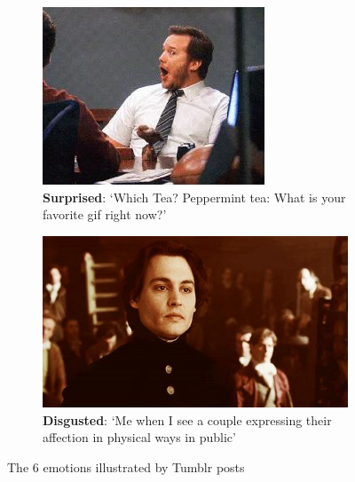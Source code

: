 \begin{figure}
\begin{subfigure}[t]{.5\textwidth}
  \includegraphics[width=.8\linewidth]{Images/surprised.jpg}
  \caption{\textbf{Surprised}: `Which Tea? Peppermint tea: What is your favorite gif right now?'}
\end{subfigure}
\begin{subfigure}[t]{.5\textwidth}
  \vskip 0pt 
  \centering
  \includegraphics[width=.8\linewidth]{Images/disgusted.jpg}
  \caption{\textbf{Disgusted}: `Me when I see a couple expressing their affection in physical ways in public'}
\end{subfigure}
\caption{The 6 emotions illustrated by Tumblr posts \cite{tumblr-photos}}
\end{figure}